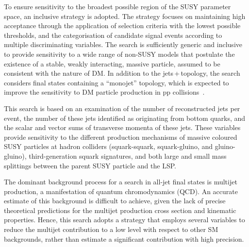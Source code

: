 To ensure sensitivity to the broadest possible region of the SUSY
parameter space, an inclusive strategy is adopted. The strategy
focuses on maintaining high acceptance through the application of
selection criteria with the lowest possible thresholds, and the
categorisation of candidate signal events according to multiple
discriminating variables.  The search is sufficiently generic and
inclusive to provide sensitivity to a wide range of
non-SUSY %
models that postulate the existence of a stable, weakly interacting,
massive particle, assumed to be consistent with the nature of DM. In
addition to the jets$\,$+$\,$\ptvecmiss topology, the search considers
final states containing a ``monojet'' topology, which is expected to
improve the sensitivity to DM particle production in pp
collisions~\cite{Fox:2012ee, Buchmueller:2015eea}.

This search is based on an examination of the number of reconstructed
jets per event, the number of these jets identified as originating
from bottom quarks, and the scalar and vector sums of transverse
momenta of these jets. These variables provide sensitivity to the
different production mechanisms of massive coloured SUSY particles at
hadron colliders (\ie squark-squark, squark-gluino, and
gluino-gluino), third-generation squark signatures, and both large and
small mass splittings between the parent SUSY particle and the LSP.

The dominant background process for a search in all-jet final states
is multijet production, a manifestation of quantum chromodynamics
(QCD). An accurate estimate of this background is difficult to
achieve, given the lack of precise theoretical predictions for the
multijet production cross section and kinematic properties. 
Hence, this search adopts a strategy that employs several variables to
reduce the multijet contribution to a low level with respect to other
SM backgrounds, rather than estimate a significant contribution with
high precision.

